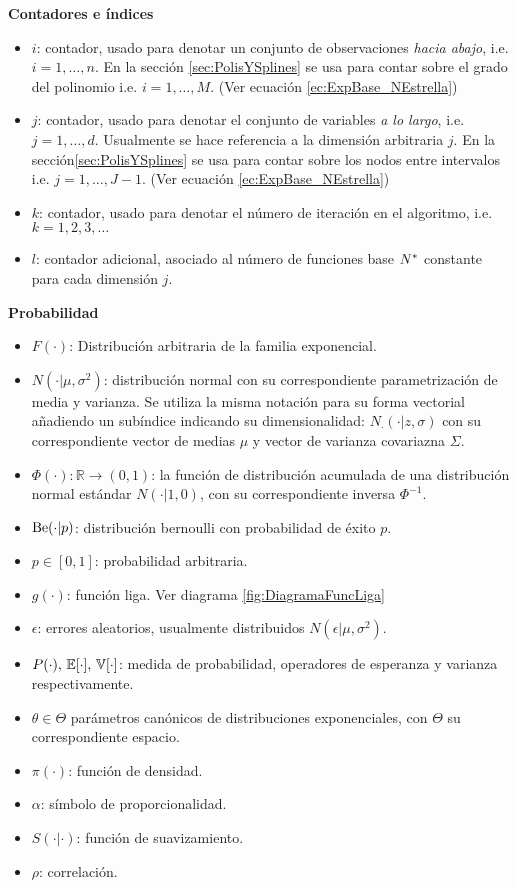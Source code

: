 \documentclass[../../Main/Main.tex]{subfiles}
\begin{document}
\textbf{Contadores e índices}
\begin{itemize}[label={}]
	\item $i$: contador, usado para denotar un conjunto de observaciones \textit{hacia abajo}, i.e. $i = 1,\ldots,n$. En la sección \ref{sec:PolisYSplines} se usa para contar sobre el grado del polinomio i.e. $i = 1,\ldots,M$. (Ver ecuación \ref{ec:ExpBase_NEstrella})
	\item $j$: contador, usado para denotar el conjunto de variables \textit{a lo largo}, i.e. $j = 1,\ldots,d$. Usualmente se hace referencia a la dimensión arbitraria $j$. En la sección\ref{sec:PolisYSplines} se usa para contar sobre los nodos entre intervalos i.e. $j = 1,\ldots,J-1$. (Ver ecuación \ref{ec:ExpBase_NEstrella})
	\item $k$: contador, usado para denotar el número de iteración en el algoritmo, i.e. $k = 1,2,3,\ldots$
	\item $l$: contador adicional, asociado al número de funciones base $N^*$ constante para cada dimensión $j$.
\end{itemize}
	
\textbf{Probabilidad}
\begin{itemize}[label={}]
	\item $F(\cdot)$: Distribución arbitraria de la familia exponencial. 
	\item $N(\cdot|\mu,\sigma^2)$: distribución normal con su correspondiente parametrización de media y varianza. Se utiliza la misma notación para su forma vectorial añadiendo un subíndice indicando su dimensionalidad: $N_{\cdot}(\cdot|z,\sigma)$ con su correspondiente vector de medias $\mu$ y vector de varianza covariazna $\Sigma$. 
	\item $\Phi(\cdot):\mathbb{R}\rightarrow(0,1)$: la función de distribución acumulada de una distribución normal estándar $N(\cdot| 1,0)$, con su correspondiente inversa $\Phi^{-1}$. 
	\item $\text{Be}(\cdot|p)$: distribución bernoulli con probabilidad de éxito $p$.
	\item $p \in [0,1]$: probabilidad arbitraria. 
	\item $g(\cdot)$: función liga. Ver diagrama \ref{fig:DiagramaFuncLiga}
	\item $\epsilon$: errores aleatorios, usualmente distribuidos $N(\epsilon|\mu,\sigma^2)$.
	\item $P(\cdot),\, \mathbb{E}[\cdot],\, \mathbb{V}[\cdot]$: medida de probabilidad, operadores de esperanza y varianza respectivamente.
	\item $\theta \in \Theta$ parámetros canónicos de distribuciones exponenciales, con $\Theta$ su correspondiente espacio. 
	\item $\pi(\cdot)$: función de densidad.
	\item $\alpha$: símbolo de proporcionalidad.
	\item $S(\cdot|\cdot)$: función de suavizamiento. 
	\item $\rho$: correlación.
\end{itemize}
	
\end{document}
